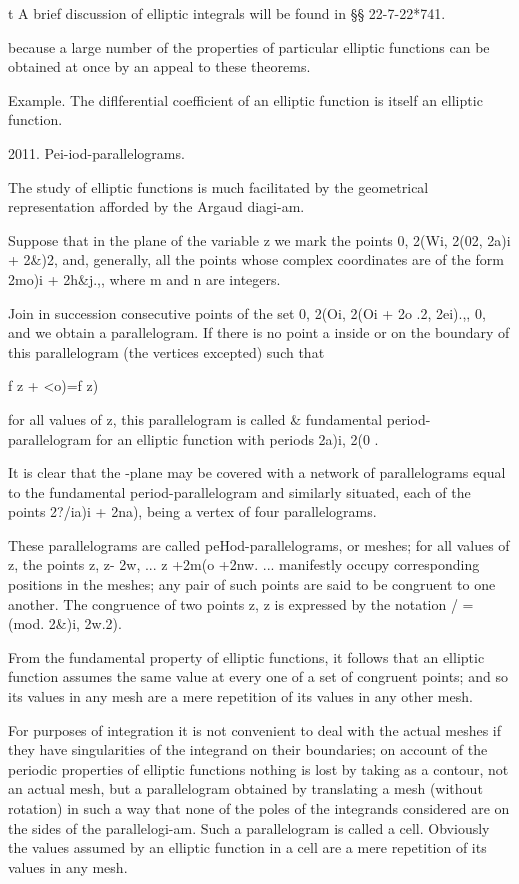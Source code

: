 t A brief discussion of elliptic integrals will be found in §§
22-7-22*741.

%
%

because a large number of the properties of particular elliptic
functions can be obtained at once by an appeal to these theorems.

Example. The diflferential coefficient of an elliptic function is
itself an elliptic function.

2011. Pei-iod-parallelograms.

The study of elliptic functions is much facilitated by the geometrical
representation afforded by the Argaud diagi-am.

Suppose that in the plane of the variable z we mark the points 0,
2(Wi, 2(02, 2a)i + 2\&)2, and, generally, all the points whose complex
coordinates are of the form 2mo)i + 2h\&j.,, where m and n are
integers.

Join in succession consecutive points of the set 0, 2(Oi, 2(Oi + 2o
.2, 2ei).,, 0, and we obtain a parallelogram. If there is no point a
inside or on the boundary of this parallelogram (the vertices
excepted) such that

f z + <o)=f z)

for all values of z, this parallelogram is called \& fundamental
period-parallelogram for an elliptic function with periods 2a)i, 2(0
.

It is clear that the -plane may be covered with a network of
parallelograms equal to the fundamental period-parallelogram and
similarly situated, each of the points 2?/ia)i + 2na), being a vertex
of four parallelograms.

These parallelograms are called peHod-parallelograms, or meshes; for
all values of z, the points z, z- 2w, ... z +2m(o +2nw. ...
manifestly occupy corresponding positions in the meshes; any pair of
such points are said to be congruent to one another. The congruence of
two points z, z is expressed by the notation / = (mod. 2\&)i, 2w.2).

From the fundamental property of elliptic functions, it follows that
an elliptic function assumes the same value at every one of a set of
congruent points; and so its values in any mesh are a mere repetition
of its values in any other mesh.

For purposes of integration it is not convenient to deal with the
actual meshes if they have singularities of the integrand on their
boundaries; on account of the periodic properties of elliptic
functions nothing is lost by taking as a contour, not an actual mesh,
but a parallelogram obtained by translating a mesh (without rotation)
in such a way that none of the poles of the integrands considered are
on the sides of the parallelogi-am. Such a parallelogram is called a
cell. Obviously the values assumed by an elliptic function in a cell
are a mere repetition of its values in any mesh.


